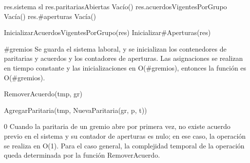 {
	\state res.sistema \asig sl								
	\state res.paritariasAbiertas \asig Vacío()				
	\state res.acuerdosVigentesPorGrupo \asig Vacía()		
	\state res.\#aperturas \asig Vacía()					
	\state

	\state InicializarAcuerdosVigentesPorGrupo(res)			
	\state Inicializar\#Aperturas(res)						
}
{\#gremios}
{ Se guarda el sistema laboral, y se inicializan los contenedores de paritarias y acuerdos y los contadores de aperturas. Las asignaciones se realizan en tiempo constante y las inicializaciones en O(\#gremios), entonces la función es O(\#gremios). }

{
						
		\state RemoverAcuerdo(tmp, gr)							
	\endif
	\state

	\state AgregarParitaria(tmp, NuevaParitaria(gr, p, t))		
}
{0}
{ Cuando la paritaria de un gremio abre por primera vez, no existe acuerdo previo en el sistema y su contador de aperturas es nulo; en ese caso, la operación se realiza en O(1). Para el caso general, la complejidad temporal de la operación queda determinada por la función RemoverAcuerdo. }

